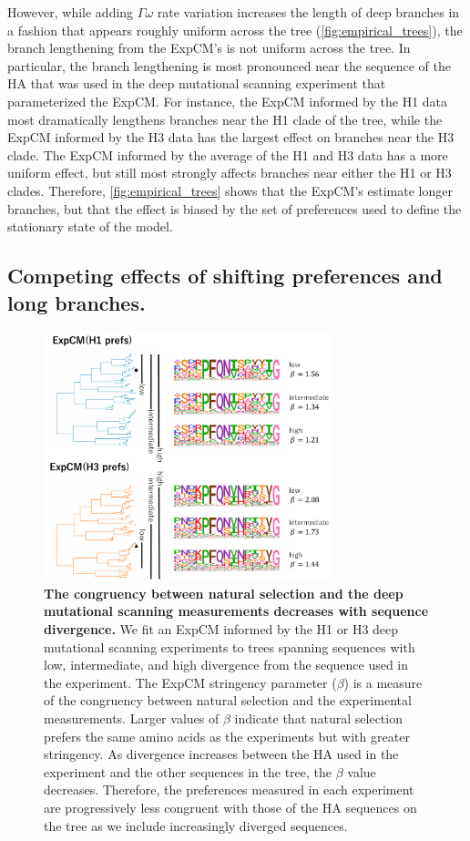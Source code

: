 \documentclass[11pt]{article}
\begin{document}
However, while adding $\Gamma\omega$ rate variation increases the length of deep branches in a fashion that appears roughly uniform across the tree (\ref{fig:empirical_trees}), the branch lengthening from the ExpCM's is not uniform across the tree. 
In particular, the branch lengthening is most pronounced near the sequence of the HA that was used in the deep mutational scanning experiment that parameterized the ExpCM.
For instance, the ExpCM informed by the H1 data most dramatically lengthens branches near the H1 clade of the tree, while the ExpCM informed by the H3 data has the largest effect on branches near the H3 clade.
The ExpCM informed by the average of the H1 and H3 data has a more uniform effect, but still most strongly affects branches near either the H1 or H3 clades.
Therefore, \ref{fig:empirical_trees} shows that the ExpCM's estimate longer branches, but that the effect is biased by the set of preferences used to define the stationary state of the model.

\subsection*{Competing effects of shifting preferences and long branches.}

\begin{figure}
\centerline{\includegraphics[width=0.75\textwidth]{figures/compete}}
\caption{\label{fig:compete}
\textbf{The congruency between natural selection and the deep mutational scanning measurements decreases with sequence divergence.} 
We fit an ExpCM informed by the H1 or H3 deep mutational scanning experiments to trees spanning sequences with low, intermediate, and high divergence from the sequence used in the experiment. 
The ExpCM stringency parameter ($\beta$) is a measure of the congruency between natural selection and the experimental measurements. 
Larger values of $\beta$ indicate that natural selection prefers the same amino acids as the experiments but with greater stringency. 
As divergence increases between the HA used in the experiment and the other sequences in the tree, the $\beta$ value decreases.
Therefore, the preferences measured in each experiment are progressively less congruent with those of the HA sequences on the tree as we include increasingly diverged sequences. 
}
\end{figure}
\end{document}
